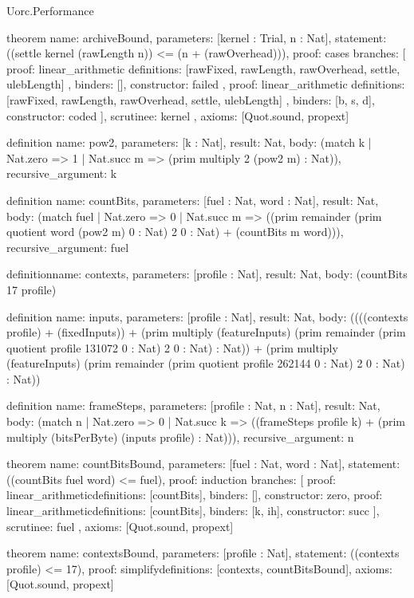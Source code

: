 \begin{lexlean}{Uorc.Performance}
\begin{semanticmodule}
theorem{
  name: archiveBound,
  parameters: [kernel : Trial, n : Nat],
  statement: ((settle kernel (rawLength n)) <= (n + (rawOverhead))),
  proof: cases{
    branches: [
      {
        proof: linear_arithmetic{
          definitions: [rawFixed, rawLength, rawOverhead, settle, ulebLength]
        },
        binders: [],
        constructor: failed
      },
      {
        proof: linear_arithmetic{
          definitions: [rawFixed, rawLength, rawOverhead, settle, ulebLength]
        },
        binders: [b, s, d],
        constructor: coded
      }
    ],
    scrutinee: kernel
  },
  axioms: [Quot.sound, propext]
}

definition{
  name: pow2,
  parameters: [k : Nat],
  result: Nat,
  body: (match k | Nat.zero => 1 | Nat.succ m => (prim multiply 2 (pow2 m) : Nat)),
  recursive_argument: k
}

definition{
  name: countBits,
  parameters: [fuel : Nat, word : Nat],
  result: Nat,
  body: (match fuel
    | Nat.zero => 0
    | Nat.succ m => ((prim remainder (prim quotient word (pow2 m) 0 : Nat) 2 0 : Nat) + (countBits m word))),
  recursive_argument: fuel
}

definition{name: contexts, parameters: [profile : Nat], result: Nat, body: (countBits 17 profile)}

definition{
  name: inputs,
  parameters: [profile : Nat],
  result: Nat,
  body: ((((contexts profile) + (fixedInputs)) + (prim multiply (featureInputs) (prim remainder (prim quotient profile 131072 0 : Nat) 2 0 : Nat) : Nat)) + (prim multiply (featureInputs) (prim remainder (prim quotient profile 262144 0 : Nat) 2 0 : Nat) : Nat))
}

definition{
  name: frameSteps,
  parameters: [profile : Nat, n : Nat],
  result: Nat,
  body: (match n
    | Nat.zero => 0
    | Nat.succ k => ((frameSteps profile k) + (prim multiply (bitsPerByte) (inputs profile) : Nat))),
  recursive_argument: n
}

theorem{
  name: countBitsBound,
  parameters: [fuel : Nat, word : Nat],
  statement: ((countBits fuel word) <= fuel),
  proof: induction{
    branches: [
      {proof: linear_arithmetic{definitions: [countBits]}, binders: [], constructor: zero},
      {proof: linear_arithmetic{definitions: [countBits]}, binders: [k, ih], constructor: succ}
    ],
    scrutinee: fuel
  },
  axioms: [Quot.sound, propext]
}

theorem{
  name: contextsBound,
  parameters: [profile : Nat],
  statement: ((contexts profile) <= 17),
  proof: simplify{definitions: [contexts, countBitsBound]},
  axioms: [Quot.sound, propext]
}


\end{semanticmodule}
\end{lexlean}
